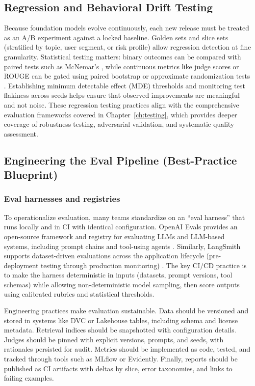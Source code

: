 \subsection{Regression and Behavioral Drift Testing}
Because foundation models evolve continuously, each new release must be treated as an A/B experiment against a locked baseline. Golden sets and slice sets (stratified by topic, user segment, or risk profile) allow regression detection at fine granularity. Statistical testing matters: binary outcomes can be compared with paired tests such as McNemar's \cite{mcnemar1947}, while continuous metrics like judge scores or ROUGE can be gated using paired bootstrap or approximate randomization tests \cite{koehn2004}. Establishing minimum detectable effect (MDE) thresholds and monitoring test flakiness across seeds helps ensure that observed improvements are meaningful and not noise. These regression testing practices align with the comprehensive evaluation frameworks covered in Chapter~\ref{ch:testing}, which provides deeper coverage of robustness testing, adversarial validation, and systematic quality assessment.

\subsection{Engineering the Eval Pipeline (Best-Practice Blueprint)}
\subsubsection{Eval harnesses and registries}
To operationalize evaluation, many teams standardize on an ``eval harness'' that runs locally and in CI with identical configuration. OpenAI Evals provides an open-source framework and registry for evaluating LLMs and LLM-based systems, including prompt chains and tool-using agents \cite{openai_evals,openai_evals_cookbook}. Similarly, LangSmith supports dataset-driven evaluations across the application lifecycle (pre-deployment testing through production monitoring) \cite{langsmith_evaluation}. The key CI/CD practice is to make the harness deterministic in inputs (datasets, prompt versions, tool schemas) while allowing non-deterministic model sampling, then score outputs using calibrated rubrics and statistical thresholds.

Engineering practices make evaluation sustainable. Data should be versioned and stored in systems like DVC or Lakehouse tables, including schema and license metadata. Retrieval indices should be snapshotted with configuration details. Judges should be pinned with explicit versions, prompts, and seeds, with rationales persisted for audit. Metrics should be implemented as code, tested, and tracked through tools such as MLflow or Evidently. Finally, reports should be published as CI artifacts with deltas by slice, error taxonomies, and links to failing examples.  

